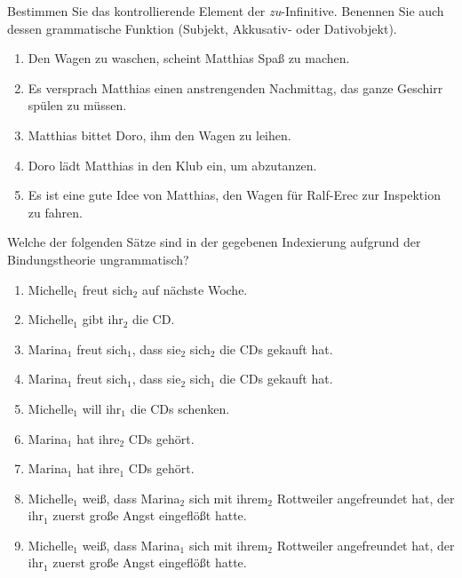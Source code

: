  \label{exc:relationenundpraedikate09} Bestimmen Sie das kontrollierende Element der \textit{zu}-Infinitive.
Benennen Sie auch dessen grammatische Funktion (Subjekt, Akkusativ- oder Dativobjekt).

\begin{enumerate}
  \item Den Wagen zu waschen, scheint Matthias Spaß zu machen.
  \item Es versprach Matthias einen anstrengenden Nachmittag, das ganze Geschirr spülen zu müssen.
  \item Matthias bittet Doro, ihm den Wagen zu leihen.
  \item Doro lädt Matthias in den Klub ein, um abzutanzen.
  \item Es ist eine gute Idee von Matthias, den Wagen für Ralf-Erec zur Inspektion zu fahren.
\end{enumerate}

 \label{exc:relationenundpraedikate10} Welche der folgenden Sätze sind in der gegebenen Indexierung aufgrund der Bindungstheorie ungrammatisch?

\begin{enumerate}
  \item Michelle$_{\textrm{1}}$ freut sich$_{\textrm{2}}$ auf nächste Woche.
  \item Michelle$_{\textrm{1}}$ gibt ihr$_{\textrm{2}}$ die CD.
  \item Marina$_{\textrm{1}}$ freut sich$_{\textrm{1}}$, dass sie$_{\textrm{2}}$ sich$_{\textrm{2}}$ die CDs gekauft hat.
  \item Marina$_{\textrm{1}}$ freut sich$_{\textrm{1}}$, dass sie$_{\textrm{2}}$ sich$_{\textrm{1}}$ die CDs gekauft hat.
  \item Michelle$_{\textrm{1}}$ will ihr$_{\textrm{1}}$ die CDs schenken.
  \item Marina$_{\textrm{1}}$ hat ihre$_{\textrm{2}}$ CDs gehört.
  \item Marina$_{\textrm{1}}$ hat ihre$_{\textrm{1}}$ CDs gehört.
  \item Michelle$_{\textrm{1}}$ weiß, dass Marina$_{\textrm{2}}$ sich mit ihrem$_{\textrm{2}}$ Rottweiler angefreundet hat, der ihr$_{\textrm{1}}$ zuerst große Angst eingeflößt hatte.
  \item Michelle$_{\textrm{1}}$ weiß, dass Marina$_{\textrm{1}}$ sich mit ihrem$_{\textrm{2}}$ Rottweiler angefreundet hat, der ihr$_{\textrm{1}}$ zuerst große Angst eingeflößt hatte.
\end{enumerate}

